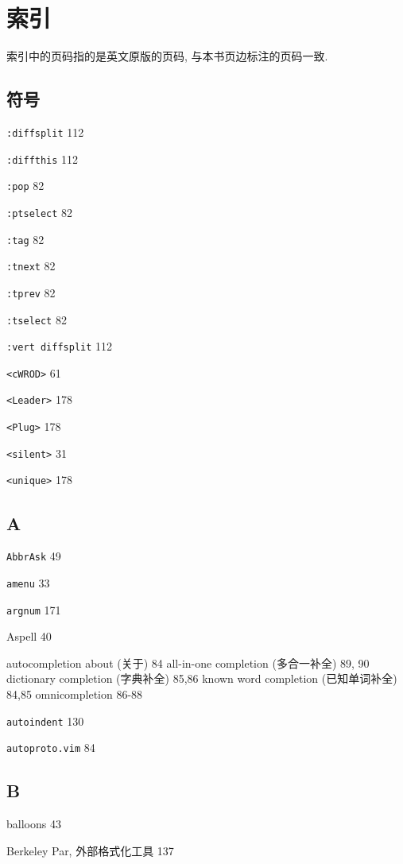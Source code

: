 \chapter{索引}
\label{chap:index}

索引中的页码指的是英文原版的页码, 与本书页边标注的页码一致.

\section{符号}

\texttt{:diffsplit} 112

\texttt{:diffthis} 112

\texttt{:pop} 82

\texttt{:ptselect} 82

\texttt{:tag} 82

\texttt{:tnext} 82

\texttt{:tprev} 82

\texttt{:tselect} 82

\texttt{:vert diffsplit} 112

\texttt{<cWROD>} 61

\texttt{<Leader>} 178

\texttt{<Plug>} 178

\texttt{<silent>} 31

\texttt{<unique>} 178

\section{A}

\texttt{AbbrAsk} 49

\texttt{amenu} 33

\texttt{argnum} 171

Aspell 40

autocompletion
  about (关于) 84
  all-in-one completion (多合一补全) 89, 90
  dictionary completion (字典补全) 85,86
  known word completion (已知单词补全) 84,85
  omnicompletion 86-88

\texttt{autoindent} 130

\texttt{autoproto.vim} 84

\section{B}

balloons 43

Berkeley Par, 外部格式化工具 137

